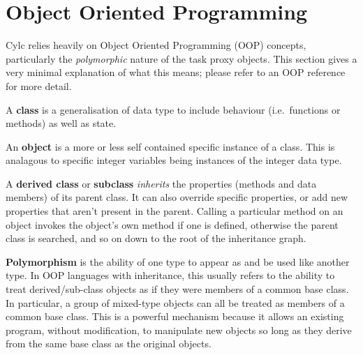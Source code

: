 \documentclass[11pt,a4paper]{article}
\begin{document}
\pagebreak
\appendix

\section{Object Oriented Programming}

Cylc relies heavily on Object Oriented Programming (OOP) concepts,
particularly the {\em polymorphic} nature of the task proxy objects.
This section gives a very minimal explanation of what this means;
please refer to an OOP reference for more detail.

A {\bf class} is a generalisation of data type to include behaviour
(i.e.\ functions or methods) as well as state. 


An {\bf object} is a more or less self contained specific instance
of a class. This is analagous to specific integer variables being 
instances of the integer data type.

A {\bf derived class} or {\bf subclass} {\em inherits} the properties
(methods and data members) of its parent class. It can also override
specific properties, or add new properties that aren't present in the
parent. Calling a particular method on an object invokes the object's
own method if one is defined, otherwise the parent class is searched,
and so on down to the root of the inheritance graph. 



{\bf Polymorphism} is the ability of one type to appear as and be used
like another type.  In OOP languages with inheritance, this usually
refers to the ability to treat derived/sub-class objects as if they were
members of a common base class. In particular, a group of mixed-type
objects can all be treated as members of a common base class. 
This is a powerful mechanism because it allows an existing program,
without modification, to manipulate new objects so long as they 
derive from the same base class as the original objects.
\end{document}
